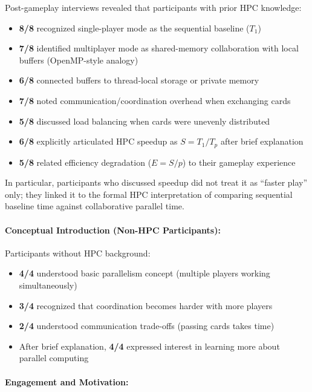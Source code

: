 Post-gameplay interviews revealed that participants with prior HPC knowledge:

\begin{itemize}
    \item \textbf{8/8} recognized single-player mode as the sequential baseline ($T_1$)
    \item \textbf{7/8} identified multiplayer mode as shared-memory collaboration with local buffers (OpenMP-style analogy)
    \item \textbf{6/8} connected buffers to thread-local storage or private memory
    \item \textbf{7/8} noted communication/coordination overhead when exchanging cards
    \item \textbf{5/8} discussed load balancing when cards were unevenly distributed
    \item \textbf{6/8} explicitly articulated HPC speedup as $S = T_1 / T_p$ after brief explanation
    \item \textbf{5/8} related efficiency degradation ($E = S/p$) to their gameplay experience
\end{itemize}

In particular, participants who discussed speedup did not treat it as ``faster play'' only; they linked it to the formal HPC interpretation of comparing sequential baseline time against collaborative parallel time.

\paragraph*{Conceptual Introduction (Non-HPC Participants):}

Participants without HPC background:

\begin{itemize}
    \item \textbf{4/4} understood basic parallelism concept (multiple players working simultaneously)
    \item \textbf{3/4} recognized that coordination becomes harder with more players
    \item \textbf{2/4} understood communication trade-offs (passing cards takes time)
    \item After brief explanation, \textbf{4/4} expressed interest in learning more about parallel computing
\end{itemize}

\paragraph*{Engagement and Motivation:}

